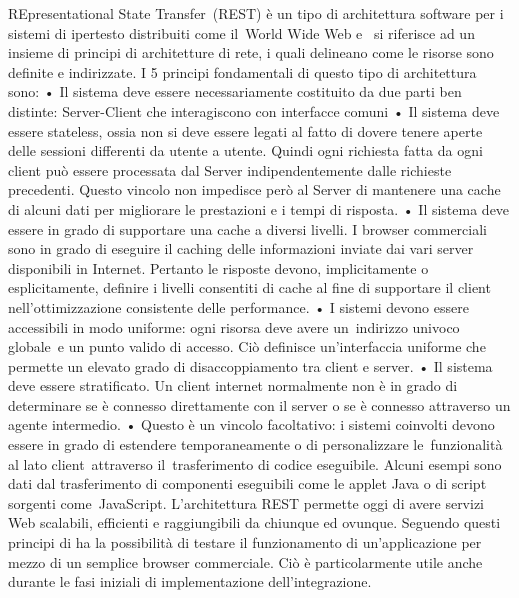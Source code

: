 REpresentational State Transfer (REST) è un tipo di architettura software per i sistemi di ipertesto distribuiti come il World Wide Web e  si riferisce ad un insieme di principi di architetture di rete, i quali delineano come le risorse sono definite e indirizzate. I 5 principi fondamentali di questo tipo di architettura sono:
•   Il sistema deve essere necessariamente costituito da due parti ben distinte: Server-Client che interagiscono con interfacce comuni
•   Il sistema deve essere stateless, ossia non si deve essere legati al fatto di dovere tenere aperte delle sessioni differenti da utente a utente. Quindi ogni richiesta fatta da ogni client può essere processata dal Server indipendentemente dalle richieste precedenti. Questo vincolo non impedisce però al Server di mantenere una cache di alcuni dati per migliorare le prestazioni e i tempi di risposta.
•   Il sistema deve essere in grado di supportare una cache a diversi livelli. I browser commerciali sono in grado di eseguire il caching delle informazioni inviate dai vari server disponibili in Internet. Pertanto le risposte devono, implicitamente o esplicitamente, definire i livelli consentiti di cache al fine di supportare il client nell’ottimizzazione consistente delle performance.
•   I sistemi devono essere accessibili in modo uniforme: ogni risorsa deve avere un indirizzo univoco globale e un punto valido di accesso. Ciò definisce un’interfaccia uniforme che permette un elevato grado di disaccoppiamento tra client e server.
•   Il sistema deve essere stratificato. Un client internet normalmente non è in grado di determinare se è connesso direttamente con il server o se è connesso attraverso un agente intermedio.
•   Questo è un vincolo facoltativo: i sistemi coinvolti devono essere in grado di estendere temporaneamente o di personalizzare le funzionalità al lato client attraverso il trasferimento di codice eseguibile. Alcuni esempi sono dati dal trasferimento di componenti eseguibili come le applet Java o di script sorgenti come JavaScript.
L’architettura REST permette oggi di avere servizi Web scalabili, efficienti e raggiungibili da chiunque ed ovunque. Seguendo questi principi di ha la possibilità di testare il funzionamento di un’applicazione per mezzo di un semplice browser commerciale. Ciò è particolarmente utile anche durante le fasi iniziali di implementazione dell’integrazione.

\newpage

